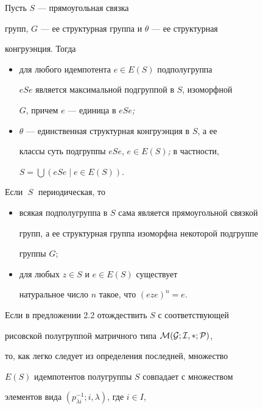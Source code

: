\begin{propm} Пусть $S$ --- прямоугольная связка


групп, $G$ --- ее структурная группа и $\theta$ --- ее структурная


конгруэнция. Тогда


\begin{itemize}


\item[(1)] для любого идемпотента $e \in E(S)$ подполугруппа


$eSe$ является максимальной подгруппой в $S$, изоморфной


$G$, причем $e$ --- единица в $eSe${\em ;}


\item[(2)] $\theta$ --- единственная структурная конгруэнция в $S$, а ее


классы суть подгруппы $eSe$, $e \in E(S)${\em ;} в частности,


$S = \bigcup ( eSe \mid e \in E(S) )$.


\end{itemize}


Если $\;S\;$ периодическая, то


\begin{itemize}


\item[(3)] всякая подполугруппа в $S$ сама является прямоугольной связкой


групп, а ее структурная группа изоморфна некоторой подгруппе


группы $G$;


\item[(4)] для любых $z \in S$ и $e \in E(S)$ существует


натуральное число $n$ такое, что $(eze)^n = e$.


\end{itemize}


\end{propm}





Если в предложении 2.2 отождествить $S$ с соответствующей


рисовской полугруппой матричного типа $\cal M(G; I, \Lambda; P)$,


то, как легко следует из определения последней, множество


$E(S)$ идемпотентов полугруппы $S$ совпадает с множеством


элементов вида $(p_{\lambda i}^{-1}; i, \lambda)$, где $i \in I$,


